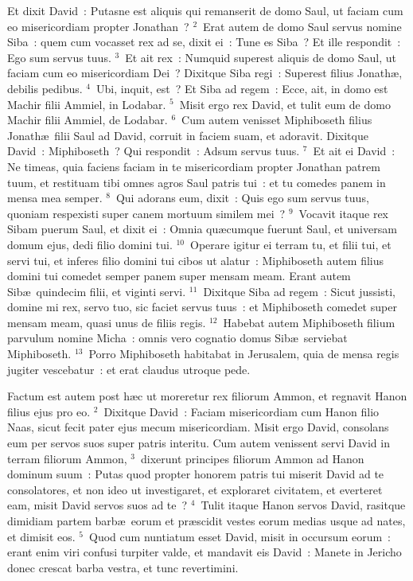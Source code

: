 \lettrine[lines=3,image=true,loversize=0.05,lraise=-0.03]{E}{}t dixit David~: Putasne est aliquis qui remanserit de domo Saul, ut faciam cum eo misericordiam propter Jonathan~?
${}^{2}$~Erat autem de domo Saul servus nomine Siba~: quem cum vocasset rex ad se, dixit ei~: Tune es Siba~? Et ille respondit~: Ego sum servus tuus.
${}^{3}$~Et ait rex~: Numquid superest aliquis de domo Saul, ut faciam cum eo misericordiam Dei~? Dixitque Siba regi~: Superest filius Jonath\ae , debilis pedibus.
${}^{4}$~Ubi, inquit, est~? Et Siba ad regem~: Ecce, ait, in domo est Machir filii Ammiel, in Lodabar.
${}^{5}$~Misit ergo rex David, et tulit eum de domo Machir filii Ammiel, de Lodabar.
${}^{6}$~Cum autem venisset Miphiboseth filius Jonath\ae\ filii Saul ad David, corruit in faciem suam, et adoravit. Dixitque David~: Miphiboseth~? Qui respondit~: Adsum servus tuus.
${}^{7}$~Et ait ei David~: Ne timeas, quia faciens faciam in te misericordiam propter Jonathan patrem tuum, et restituam tibi omnes agros Saul patris tui~: et tu comedes panem in mensa mea semper.
${}^{8}$~Qui adorans eum, dixit~: Quis ego sum servus tuus, quoniam respexisti super canem mortuum similem mei~?
${}^{9}$~Vocavit itaque rex Sibam puerum Saul, et dixit ei~: Omnia qu\ae cumque fuerunt Saul, et universam domum ejus, dedi filio domini tui.
${}^{10}$~Operare igitur ei terram tu, et filii tui, et servi tui, et inferes filio domini tui cibos ut alatur~: Miphiboseth autem filius domini tui comedet semper panem super mensam meam. Erant autem Sib\ae\ quindecim filii, et viginti servi.
${}^{11}$~Dixitque Siba ad regem~: Sicut jussisti, domine mi rex, servo tuo, sic faciet servus tuus~: et Miphiboseth comedet super mensam meam, quasi unus de filiis regis.
${}^{12}$~Habebat autem Miphiboseth filium parvulum nomine Micha~: omnis vero cognatio domus Sib\ae\ serviebat Miphiboseth.
${}^{13}$~Porro Miphiboseth habitabat in Jerusalem, quia de mensa regis jugiter vescebatur~: et erat claudus utroque pede.

\lettrine[lines=3,image=true,loversize=0.05,lraise=-0.03]{F}{}actum est autem post h\ae c ut moreretur rex filiorum Ammon, et regnavit Hanon filius ejus pro eo.
${}^{2}$~Dixitque David~: Faciam misericordiam cum Hanon filio Naas, sicut fecit pater ejus mecum misericordiam. Misit ergo David, consolans eum per servos suos super patris interitu. Cum autem venissent servi David in terram filiorum Ammon,
${}^{3}$~dixerunt principes filiorum Ammon ad Hanon dominum suum~: Putas quod propter honorem patris tui miserit David ad te consolatores, et non ideo ut investigaret, et exploraret civitatem, et everteret eam, misit David servos suos ad te~?
${}^{4}$~Tulit itaque Hanon servos David, rasitque dimidiam partem barb\ae\ eorum et pr\ae scidit vestes eorum medias usque ad nates, et dimisit eos.
${}^{5}$~Quod cum nuntiatum esset David, misit in occursum eorum~: erant enim viri confusi turpiter valde, et mandavit eis David~: Manete in Jericho donec crescat barba vestra, et tunc revertimini.


